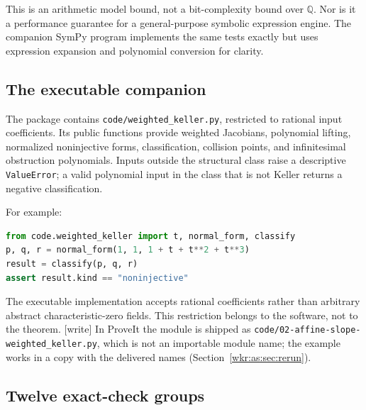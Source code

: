 \documentclass[11pt,a4paper]{article}
\numberwithin{equation}{section}
\theoremstyle{definition}
\theoremstyle{remark}
\newcommand{\Q}{\mathbb{Q}}
\newcommand{\rpath}[1]{\nolinkurl{#1}}
\begin{document}
This is an arithmetic model bound, not a bit-complexity bound over $\Q$.
Nor is it a performance guarantee for a general-purpose symbolic
expression engine. The companion SymPy program implements the same tests
exactly but uses expression expansion and polynomial conversion for
clarity.

\subsection{The executable companion}

The package contains \rpath{code/weighted_keller.py}, restricted to
rational input coefficients. Its public functions provide weighted
Jacobians, polynomial lifting, normalized noninjective forms,
classification, collision points, and infinitesimal obstruction
polynomials. Inputs outside the structural class raise a descriptive
\texttt{ValueError}; a valid polynomial input in the class that is not
Keller returns a negative classification.

For example:
\begin{lstlisting}[language=Python]
from code.weighted_keller import t, normal_form, classify
p, q, r = normal_form(1, 1, 1 + t + t**2 + t**3)
result = classify(p, q, r)
assert result.kind == "noninjective"
\end{lstlisting}
The executable implementation accepts rational coefficients rather than
arbitrary abstract characteristic-zero fields. This restriction belongs
to the software, not to the theorem.
\textup{[write]} In ProveIt the module is shipped as
\rpath{code/02-affine-slope-weighted_keller.py}, which is not an
importable module name; the example works in a copy with the delivered
names (Section~\ref{wkr:as:sec:rerun}).

\subsection{Twelve exact-check groups}
\end{document}
